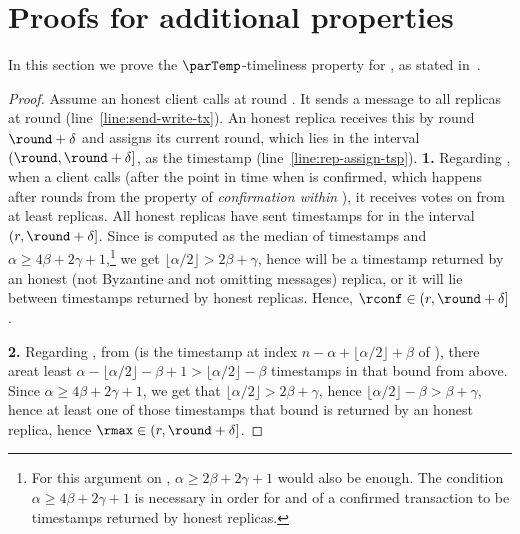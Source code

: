 \section{Proofs for additional \podtm properties}
In this section we prove the $\parTemp$-timeliness property for \podtm, as stated in~.

\begin{theorem}
\end{theorem}
\begin{proof}
	Assume an honest client \client calls \opwrite{\tx} at round \round.
	It sends a message \msgwrite{\tx} to all replicas at round \round (line~\ref{line:send-write-tx}).
	An honest replica receives this by round $\round + \delta$ and assigns its current round, which lies in the interval $(\round, \round + \delta]$, as the timestamp (line~\ref{line:rep-assign-tsp}).
		\textbf{1.} Regarding \rconf, when a client calls \opreadall{} (after the point in time when \tx is confirmed, which happens after \parConf rounds from the property of \emph{confirmation within \parConf}), it receives votes on \tx from at least \alpha replicas. All honest replicas have sent timestamps for \tx in the interval $ (r, \round + \delta]$. Since \rconf is computed as the median of \alpha timestamps and $\alpha \geq 4\beta + 2\gamma + 1$,\footnote{For this argument on \rconf, $\alpha \geq 2\beta + 2\gamma + 1$ would also be enough. The condition $\alpha \geq 4\beta + 2\gamma + 1$ is necessary in order for \rmin and \rmax of a confirmed transaction to be timestamps returned by honest replicas.}
		we get $\lfloor \alpha / 2 \rfloor > 2\beta + \gamma$,
		hence \rconf will be a timestamp returned by an honest (not Byzantine and not omitting messages) replica, or it will lie between timestamps returned by honest replicas. Hence, $\rconf \in (r, \round + \delta]$.

		\textbf{2.} Regarding \rmax, from  (\rmax is the timestamp at index $n - \alpha + \lfloor \alpha / 2 \rfloor + \beta$ of \txVotes), there areat least $\alpha - \lfloor \alpha/2 \rfloor - \beta + 1 > \lfloor \alpha/2 \rfloor - \beta$ timestamps in \txVotes that bound \rmax from above. Since $\alpha \geq 4\beta + 2 \gamma + 1$, we get that $\lfloor \alpha / 2 \rfloor > 2\beta + \gamma$, hence $\lfloor \alpha / 2 \rfloor - \beta > \beta + \gamma$, hence at least one of those timestamps that bound \rmax is returned by an honest replica, hence  $\rmax \in (r, \round + \delta]$.


\end{proof}
